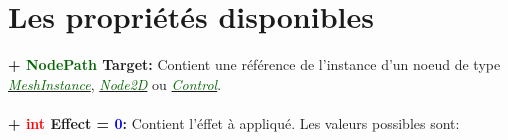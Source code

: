 \documentclass[a4paper, 11pt]{article}
\begin{document}
	\section{Les propriétés disponibles}
	\textbf{+ \textcolor{darkgreen}{NodePath} Target:} Contient une référence de l'instance d'un noeud de 
	type \href{https://docs.godotengine.org/en/stable/classes/class_meshinstance.html}
	{\textit{\textcolor{darkgreen}{MeshInstance}}},
	\href{https://docs.godotengine.org/en/stable/classes/class_node2d.html}
	{\textit{\textcolor{darkgreen}{Node2D}}} ou
	\href{https://docs.godotengine.org/en/stable/classes/class_control.html}
	{\textit{\textcolor{darkgreen}{Control}}}.\\\\
	\textbf{+ \textcolor{red}{int} Effect = \textcolor{blue}{0}:} Contient l'éffet à appliqué. Les valeurs 
	possibles sont:
\end{document}
